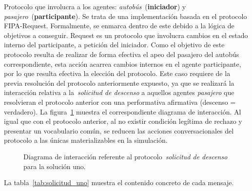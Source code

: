 Protocolo que involucra a los agentes: \textit{autobús}~(\textbf{iniciador}) y \textit{pasajero}~(\textbf{participante}). Se trata de una
implementación basada en el protocolo FIPA-Request. Formalmente, se enmarca dentro de este debido a la lógica de objetivos a conseguir.
Request es un protocolo que involucra cambios en el estado interno del participante, a petición del iniciador. Como el objetivo de este
protocolo resulta de realizar de forma efectiva el apeo del pasajero del autobús correspondiente, esta acción acarrea cambios internos
en el agente participante, por lo que resulta efectiva la elección del protocolo. Este caso requiere de la previa resolución del protocolo
anteriormente expuesto, ya que se realizará la interacción relativa a la~\textit{solicitud de descenso} a aquellos agentes \textit{pasajero}
que resolvieran el protocolo anterior con una performativa afirmativa (descenso = verdadero). La figura~\ref{fig:solicitud_uno} muestra
el correspondiente diagrama de interacción. Al igual que con el protocolo anterior, al no existir condición legítima de rechazo y presentar
un vocabulario común, se reducen las acciones conversacionales del protocolo a las únicas materializables en la simulación.

\begin{figure}[H]
 \centering
    
\caption{Diagrama de interacción referente al protocolo~\textit{solicitud de descenso} para la solución uno.}
\par\vspace{4pt}{\footnotesize Fuente: elaboración propia.}\label{fig:solicitud_uno}
\end{figure}

La tabla~\ref{tab:solicitud_uno} muestra el contenido concreto de cada mensaje.


